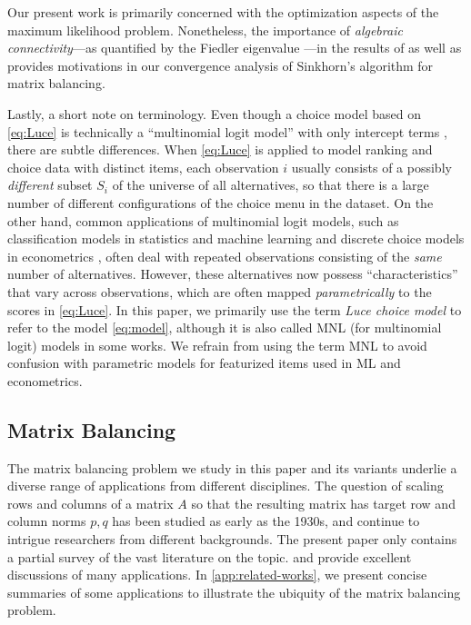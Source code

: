 Our present work is primarily concerned with the optimization aspects of the maximum likelihood problem. Nonetheless, the importance of \emph{algebraic connectivity}---as quantified by the Fiedler eigenvalue \citep{fiedler1973algebraic}---in the results of \citet{shah2015estimation,seshadri2020learning} as well as \citet{vojnovic2020convergence} provides motivations in our convergence analysis of Sinkhorn's algorithm for matrix balancing. 

Lastly, a short note on terminology. Even though a choice model based on \eqref{eq:Luce} is technically a  ``multinomial logit model'' with only intercept terms \citep{mcfadden1973conditional}, there are subtle differences. 
When \eqref{eq:Luce} is applied to model
ranking and choice data with distinct items, each observation $i$ usually consists of a possibly \emph{different}
subset $S_i$ of the universe of all alternatives, so that there is a large number of different configurations of the choice menu in the dataset. On the other hand, common applications of multinomial logit models, such as classification models in statistics and machine learning \citep{bishop2006pattern} and discrete choice models in econometrics \citep{mcfadden1973conditional}, often deal with repeated observations consisting of the \emph{same} number of alternatives. However, these alternatives now possess ``characteristics'' that vary across observations, which are often mapped \emph{parametrically} to the scores in \eqref{eq:Luce}. 
 In this paper, we primarily use the term \emph{Luce choice model} to refer to the model \eqref{eq:model}, although it is also called MNL (for multinomial logit) models in some works. We refrain from using the term MNL to avoid confusion with parametric models for featurized items used in ML and econometrics.

\subsection{Matrix Balancing}
The matrix balancing problem we study in this paper and its variants \citep{ruiz2001scaling,bradley2010algorithms} underlie a diverse range of applications from different disciplines. The  question of scaling rows and columns of a matrix $A$ so that the resulting matrix has target row and column norms $p,q$ has been studied as early as the 1930s, and continue to intrigue researchers from different backgrounds. The present paper only contains a partial survey of the vast literature on the topic. \citet{schneider1990comparative} and \citet{idel2016review} provide excellent discussions of many applications. In \cref{app:related-works}, we present concise summaries of some applications to illustrate the ubiquity of the matrix balancing problem. 

